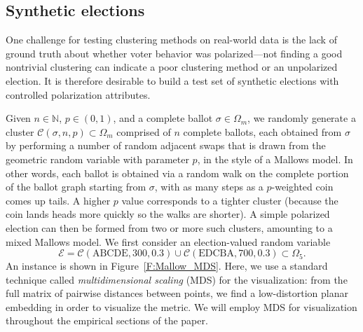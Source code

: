\documentclass{amsart}
\newcommand{\N}{\mathbb{N}}
\newcommand{\C}{\mathcal{C}}
\newcommand{\E}{\mathcal{E}}
\newcommand{\bb}{\mathfrak{b}}
\newcommand{\hh}{\mathfrak{h}}
\theoremstyle{plain}
\theoremstyle{definition}
\theoremstyle{remark}
\newtheorem{remark}[theorem]{Remark}
\begin{document}
\FloatBarrier
\subsection{Synthetic elections}\label{sec:synthetic}

One challenge for testing clustering methods on real-world data is the lack of ground truth about whether voter behavior was polarized---not finding a good nontrivial clustering can indicate a poor clustering method or an unpolarized election.  It is therefore desirable to build a test set of synthetic elections with controlled polarization attributes.

Given $n\in\N$, $p\in(0,1)$, and a complete ballot $\sigma\in\Omega_m$, we  randomly generate a cluster $\C(\sigma, n, p)\subset \Omega_m$ comprised of $n$ complete ballots, each obtained from $\sigma$ by performing a number of random adjacent swaps that is drawn from the geometric random variable with parameter $p$, in the style of a Mallows model.  In other words, each ballot is obtained via a random walk on the complete portion of the ballot graph starting from $\sigma$, with as many steps as a $p$-weighted coin comes up tails.  A higher $p$ value corresponds to a tighter cluster (because the coin lands heads more quickly so the walks are shorter).  A simple polarized election can then be formed from two or more such clusters, amounting to a mixed Mallows model.  We first consider an election-valued random variable 
$$\E=\C(\text{ABCDE}, 300, 0.3)\cup \C(\text{EDCBA} , 700, 0.3)\subset\Omega_5.$$
An instance is shown in Figure~\ref{F:Mallow_MDS}.
Here, we use a standard technique called {\em multidimensional scaling} (MDS) for the visualization:  from the full matrix of pairwise distances between points, we find a low-distortion planar embedding in order to visualize the metric.  We will employ MDS for visualization throughout the empirical sections of the paper.
\end{document}
